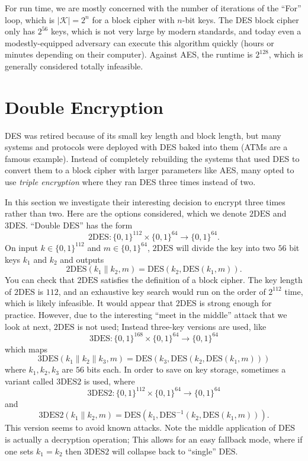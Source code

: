 \documentclass[11pt]{article}
\newcommand{\keys}{\mathcal{K}}
\newcommand{\bits}{\{0,1\}}
\newcommand{\des}{\mathrm{DES}}
\newcommand{\twodes}{\mathrm{2DES}}
\newcommand{\threedes}{\mathrm{3DES}}
\newcommand{\threedestwo}{\mathrm{3DES2}}
\begin{document}
For run time, we are mostly concerned with the number of iterations of the
``For'' loop, which is $|\keys|=2^n$ for a block cipher with $n$-bit keys.  The
DES block cipher only has $2^{56}$ keys, which is not very large by modern
standards, and today even a modestly-equipped adversary can execute this
algorithm quickly (hours or minutes depending on their computer). Against AES,
the runtime is $2^{128}$, which is generally considered totally infeasible.

\section{Double Encryption}

DES was retired because of its small key length and block length, but many
systems and protocols were deployed with DES baked into them (ATMs are a famous
example). Instead of completely rebuilding the systems that used DES to convert
them to a block cipher with larger parameters like AES, many opted to use
\emph{triple encryption} where they ran DES three times instead of two. 

In this section we investigate their interesting decision to encrypt three
times rather than two. Here are the options considered, which we denote
$\twodes$ and $\threedes$. ``Double $\des$'' has the form
\[
    \twodes : \bits^{112}\times\bits^{64}\to\bits^{64}.
\]
On input $k\in\bits^{112}$ and $m\in\bits^{64}$, $\twodes$ will divide
the key into two $56$ bit keys $k_1$ and $k_2$ and outputs
\[
    \twodes(k_1\|k_2, m) = \des(k_2,\des(k_1,m)).
\]
You can check that $\twodes$ satisfies the definition of a block cipher.
The key length of $\twodes$ is $112$, and an exhaustive key search would
run on the order of $2^{112}$ time, which is likely infeasible. It would
appear that $\twodes$ is strong enough for practice. However, due to
the interesting ``meet in the middle'' attack that we look at next, $\twodes$
is not used; Instead three-key versions are used, like
\[
    \threedes : \bits^{168}\times\bits^{64}\to\bits^{64}
\]
which maps
\[
    \threedes(k_1\|k_2\|k_3, m) = \des(k_3,\des(k_2,\des(k_1,m)))
\]
where $k_1,k_2,k_3$ are $56$ bits each. In order to save on key storage,
sometimes a variant called $\threedestwo$ is used, where
\[
    \threedestwo : \bits^{112}\times\bits^{64}\to\bits^{64}
\]
and
\[
    \threedestwo(k_1\|k_2, m) = \des(k_1,\des^{-1}(k_2,\des(k_1,m))).
\]
This version seems to avoid known attacks. Note the middle application of
$\des$ is actually a decryption operation; This allows for an easy fallback
mode, where if one sets $k_1=k_2$ then $\threedestwo$ will collapse back to
``single'' $\des$.
\end{document}
